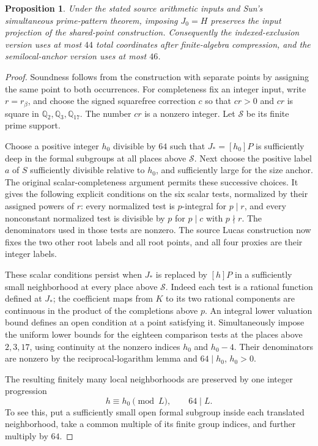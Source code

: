 \documentclass[11pt]{article}
\newtheorem{proposition}[theorem]{Proposition}
\theoremstyle{definition}
\begin{document}
\begin{proposition}
Under the stated source arithmetic inputs and Sun's simultaneous
prime-pattern theorem, imposing $J_0=H$ preserves the input projection
of the shared-point construction.  Consequently the indexed-exclusion
version uses at most $44$ total coordinates after finite-algebra
compression, and the semilocal-anchor version uses at most $46$.
\end{proposition}
\begin{proof}
Soundness follows from the construction with separate points by assigning
the same point to both occurrences.  For completeness fix an integer input,
write $r=r_\beta$, and choose the signed squarefree correction $c$ so that
$cr>0$ and $cr$ is square in $\mathbb Q_2,\mathbb Q_3,\mathbb Q_{17}$.
The number $cr$ is a nonzero integer.  Let $\mathcal S$ be its finite prime
support.

Choose a positive integer $h_0$ divisible by $64$ such that
$J_*= [h_0]P$ is sufficiently deep in the formal subgroups at all places
above $\mathcal S$.  Next choose the positive label $a$ of $S$ sufficiently
divisible relative to $h_0$, and sufficiently large for the size anchor.
The original scalar-completeness argument permits these successive choices.
It gives the following explicit conditions on the six scalar tests,
normalized by their assigned powers of $r$: every normalized test is
$p$-integral for $p\mid r$, and every nonconstant normalized test is divisible
by $p$ for $p\mid c$ with $p\nmid r$.  The denominators used in those tests
are nonzero.  The source Lucas construction now fixes the two other root
labels and all root points, and all four proxies are their integer labels.

These scalar conditions persist when $J_*$ is replaced by $[h]P$ in a
sufficiently small neighborhood at every place above $\mathcal S$.
Indeed each test is a rational function defined at $J_*$; the coefficient
maps from $K$ to its two rational components are continuous in the product
of the completions above $p$.  An integral lower valuation bound defines
an open condition at a point satisfying it.  Simultaneously impose the
uniform lower bounds for the eighteen comparison tests at the places
above $2,3,17$, using continuity at the nonzero indices $h_0$ and $h_0-4$.
Their denominators are nonzero by the reciprocal-logarithm lemma and
$64\mid h_0$, $h_0>0$.

The resulting finitely many local neighborhoods are preserved by one
integer progression
\[
                       h\equiv h_0\pmod L,
                       \qquad 64\mid L.
\]
To see this, put a sufficiently small open formal subgroup inside each
translated neighborhood, take a common multiple of its finite group
indices, and further multiply by $64$.


\end{proof}
\end{document}
